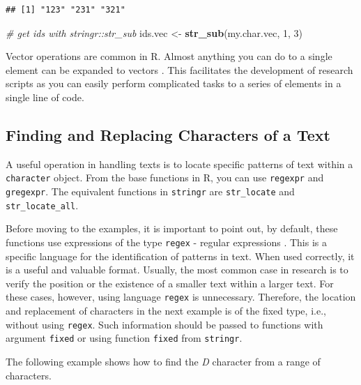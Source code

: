 \documentclass[11pt,]{book}
\newenvironment{Shaded}{\begin{snugshade}}{\end{snugshade}}
\newcommand{\KeywordTok}[1]{\textcolor[rgb]{0.27,0.27,0.27}{\textbf{#1}}}
\newcommand{\DecValTok}[1]{\textcolor[rgb]{0.06,0.06,0.06}{#1}}
\newcommand{\StringTok}[1]{\textcolor[rgb]{0.5,0.5,0.5}{#1}}
\newcommand{\CommentTok}[1]{\textcolor[rgb]{0.56,0.35,0.01}{\textit{#1}}}
\newcommand{\NormalTok}[1]{#1}
\begin{document}
\begin{verbatim}
## [1] "123" "231" "321"
\end{verbatim}

\begin{Shaded}
\begin{Highlighting}[]
\CommentTok{# get ids with stringr::str_sub}
\NormalTok{ids.vec <-}\StringTok{ }\KeywordTok{str_sub}\NormalTok{(my.char.vec, }\DecValTok{1}\NormalTok{, }\DecValTok{3}\NormalTok{)}
\end{Highlighting}
\end{Shaded}

Vector operations are common in R. Almost anything you can do to a
single element can be expanded to vectors . This facilitates the
development of research scripts as you can easily perform complicated
tasks to a series of elements in a single line of code.

\subsection{Finding and Replacing Characters of a
Text}\label{finding-and-replacing-characters-of-a-text}

A useful operation in handling texts is to locate specific patterns of
text within a \texttt{character} object. From the base functions in R,
you can use \texttt{regexpr} and \texttt{gregexpr}. The equivalent
functions in \texttt{stringr} are \texttt{str\_locate} and
\texttt{str\_locate\_all}.  
 

Before moving to the examples, it is important to point out, by default,
these functions use expressions of the type \texttt{regex} - regular
expressions \citep{thompson1968programming}. This is a specific language
for the identification of patterns in text. When used correctly, it is a
useful and valuable format. Usually, the most common case in research is
to verify the position or the existence of a smaller text within a
larger text. For these cases, however, using language \texttt{regex} is
unnecessary. Therefore, the location and replacement of characters in
the next example is of the fixed type, i.e., without using
\texttt{regex}. Such information should be passed to functions with
argument \texttt{fixed} or using function \texttt{fixed} from
\texttt{stringr}.  

The following example shows how to find the \emph{D} character from a
range of characters.
\end{document}
